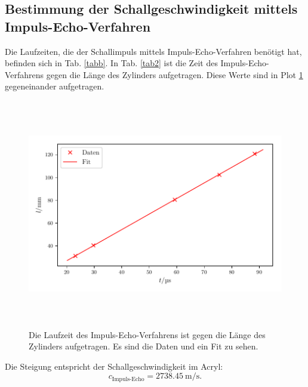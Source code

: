 \subsection{Bestimmung der Schallgeschwindigkeit mittels Impuls-Echo-Verfahren}
Die Laufzeiten, die der Schallimpuls mittels Impuls-Echo-Verfahren benötigt hat,
befinden sich in Tab. \ref{tabb}. In Tab. \ref{tab2} ist die Zeit des Impuls-Echo-Verfahrens
gegen die Länge des Zylinders aufgetragen. Diese Werte sind in Plot \ref{fig:plot2}
gegeneinander aufgetragen.


\begin{figure}
    \centering
    \includegraphics[width=15cm, height=10cm]{build/plot2.pdf}
    \caption{Die Laufzeit des Impuls-Echo-Verfahrens ist gegen die Länge des Zylinders
    aufgetragen. Es sind die Daten und ein Fit zu sehen.}
    \label{fig:plot2}
\end{figure}
\noindent Die Steigung entspricht der Schallgeschwindigkeit im Acryl:
\begin{equation*}
    c_{\text{Impuls-Echo}} = \SI{2738.45}{\meter\per\second}.
\end{equation*}


